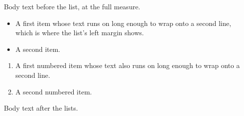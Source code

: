 \documentclass{article}
\begin{document}
Body text before the list, at the full measure.

\begin{itemize}
  \item A first item whose text runs on long enough to wrap onto a second
    line, which is where the list's left margin shows.
  \item A second item.
\end{itemize}

\begin{enumerate}
  \item A first numbered item whose text also runs on long enough to wrap
    onto a second line.
  \item A second numbered item.
\end{enumerate}

Body text after the lists.
\end{document}
